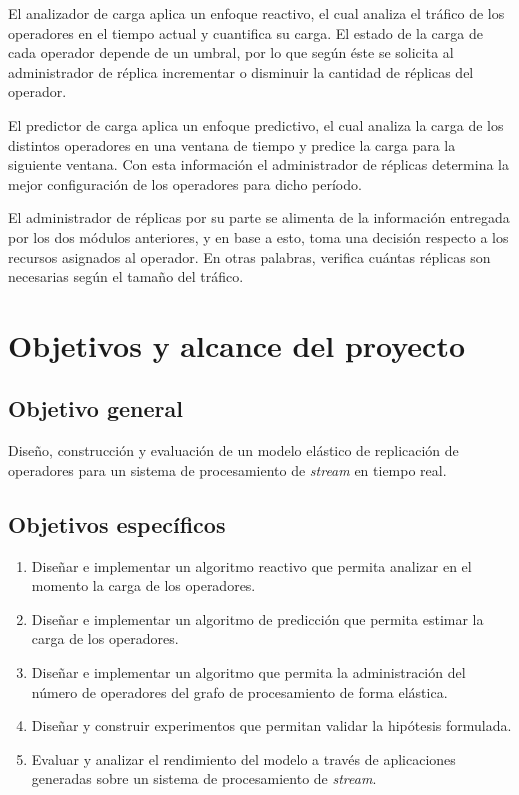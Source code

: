 El analizador de carga aplica un enfoque reactivo, el cual analiza el tráfico de los operadores en el tiempo actual y cuantifica su carga. El estado de la carga de cada operador depende de un umbral, por lo que según éste se solicita al administrador de réplica incrementar o disminuir la cantidad de réplicas del operador.

El predictor de carga aplica un enfoque predictivo, el cual analiza la carga de los distintos operadores en una ventana de tiempo y predice la carga para la siguiente ventana. Con esta información el administrador de réplicas determina la mejor configuración de los operadores para dicho período.

El administrador de réplicas por su parte se alimenta de la información entregada por los dos módulos anteriores, y en base a esto, toma una decisión respecto a los recursos asignados al operador. En otras palabras, verifica cuántas réplicas son necesarias según el tamaño del tráfico.

\section{Objetivos y alcance del proyecto}
\label{intro:objetivos}

\subsection{Objetivo general}
	Dise\~no, construcción y evaluaci\'on de un modelo elástico de replicación de operadores para un sistema de procesamiento de \textit{stream} en tiempo real.

\subsection{Objetivos específicos}
\begin{enumerate}
	\item Dise\~nar e implementar un algoritmo reactivo que permita analizar en el momento la carga de los operadores.
	\item Dise\~nar e implementar un algoritmo de predicci\'on que permita estimar la carga de los operadores.
	\item Dise\~nar e implementar un algoritmo que permita la administraci\'on del número de operadores del grafo de procesamiento de forma el\'astica.
	\item Dise\~nar y construir experimentos que permitan validar la hip\'otesis formulada.
	\item Evaluar y analizar el rendimiento del modelo a trav\'es de aplicaciones generadas sobre un sistema de procesamiento de \textit{stream}.
\end{enumerate}

